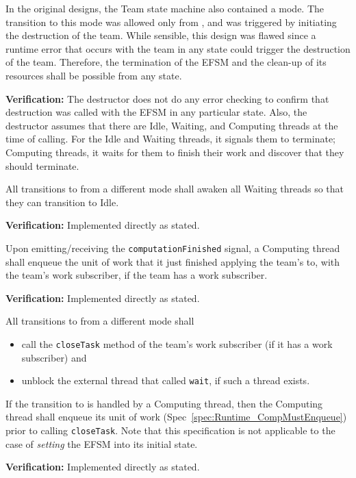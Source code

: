 \documentclass{article}
\begin{document}
\begin{spec}
In the original designs, the Team state machine also contained a
{\TeamTerminating} mode.  The transition to this mode was allowed only from
{\TeamIdle}, and was triggered by initiating the destruction of the team.  While
sensible, this design was flawed since a runtime error that occurs with the team
in any state could trigger the destruction of the team.  Therefore, the
termination of the EFSM and the clean-up of its resources shall be possible from
any state.
\end{spec}
\textbf{Verification:}\hspace{0.125in}  The destructor does not do any error
checking to confirm that destruction was called with the EFSM in any particular
state.  Also, the destructor assumes that there are Idle, Waiting, and Computing
threads at the time of calling.  For the Idle and Waiting threads, it signals
them to terminate; Computing threads, it waits for them to finish their work and
discover that they should terminate.

\begin{spec}
\label{spec:Runtime_AwakenOnNoMoreWork}
All transitions to {\TeamRunningNoMoreWork} from a different mode shall awaken
all Waiting threads so that they can transition to Idle.
\end{spec}
\textbf{Verification:}\hspace{0.125in}  Implemented directly as stated.

\begin{spec}
\label{spec:Runtime_CompMustEnqueue}
Upon emitting/receiving the \texttt{computationFinished} signal, a Computing
thread shall enqueue the unit of work that it just finished applying the team's
\taskroutine to, with the team's work subscriber, if the team has a work subscriber.
\end{spec}
\textbf{Verification:}\hspace{0.125in}  Implemented directly as stated.

\begin{spec}
\label{spec:Runtime_IdleOutput}
All transitions to {\TeamIdle} from a different mode shall
\begin{itemize}
\item{call the \texttt{closeTask} method of the team's work subscriber (if it
has a work subscriber) and }
\item{unblock the external thread that called \texttt{wait}, if such a thread
exists.}
\end{itemize}
If the transition to {\TeamIdle} is handled by a Computing thread, then the
Computing thread shall enqueue its unit of work
(Spec~\ref{spec:Runtime_CompMustEnqueue}) prior to calling \texttt{closeTask}.
Note that this specification is not applicable to the case of \textit{setting}
the EFSM into its initial state.
\end{spec}
\textbf{Verification:}\hspace{0.125in}  Implemented directly as stated.
\end{document}
